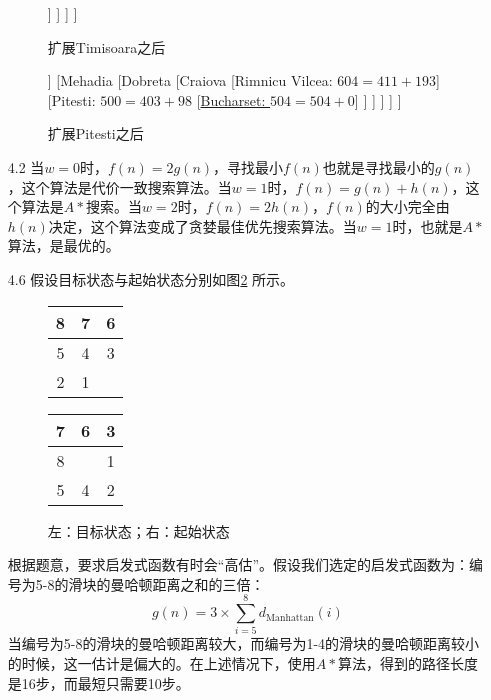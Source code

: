\documentclass[UTF8,zihao=-4]{ctexart}
\begin{document}
\begin{itemize}
\begin{figure}[htbp]
\begin{forest}
								[{Rimnicu Vilcea: $604=411+193$}]
								[{\underline{Pitesti: $500=403+98$}}]
							]
						]
					]
				]
			\end{forest}
			\caption{扩展Timisoara之后}
		\end{figure}
		\begin{figure}[htbp]
			\centering
			\begin{forest}
				[{Lugoj}
					[{Timisoara: $440=111+329$}
						[{Arad: $554=188+366$}]
					]
					[{Mehadia}
						[{Dobreta}
							[{Craiova}
								[{Rimnicu Vilcea: $604=411+193$}]
								[{Pitesti: $500=403+98$}
									[{\underline{Bucharset: $504=504+0$}}]
								]
							]
						]
					]
				]
			\end{forest}
			\caption{扩展Pitesti之后}
			\label{q1end}
		\end{figure}
		\item[4.2] 当$w=0$时，$f(n)=2g(n)$，寻找最小$f(n)$也就是寻找最小的$g(n)$，这个算法是代价一致搜索算法。当$w=1$时，$f(n)=g(n)+h(n)$，这个算法是$A*$搜索。当$w=2$时，$f(n)=2h(n)$，$f(n)$的大小完全由$h(n)$决定，这个算法变成了贪婪最佳优先搜索算法。当$w=1$时，也就是$A*$算法，是最优的。
		\pagebreak 
		\item[4.6] 假设目标状态与起始状态分别如图\ref{begin-and-target} 所示。
		\begin{figure}[htbp]
			\centering
			\begin{tabular}{|c|c|c|}
				\hline
				8 & 7 & 6 \\ \hline
				5 & 4 & 3 \\ \hline
				2 & 1 &   \\ \hline
			\end{tabular}
			\hspace{1.2cm}
			\begin{tabular}{|c|c|c|}
				\hline
				7 & 6 & 3 \\ \hline
				8 &   & 1 \\ \hline
				5 & 4 & 2 \\ \hline
			\end{tabular}
			\caption{左：目标状态；右：起始状态}
			\label{begin-and-target}
		\end{figure}
		根据题意，要求启发式函数有时会“高估”。假设我们选定的启发式函数为：编号为5-8的滑块的曼哈顿距离之和的三倍：
		\begin{equation*}
			g(n) = 3\times \sum_{i=5}^8 d_{\text{Manhattan}}(i)
		\end{equation*}
		当编号为5-8的滑块的曼哈顿距离较大，而编号为1-4的滑块的曼哈顿距离较小的时候，这一估计是偏大的。在上述情况下，使用$A*$算法，得到的路径长度是16步，而最短只需要10步。


\end{itemize}
\end{document}
